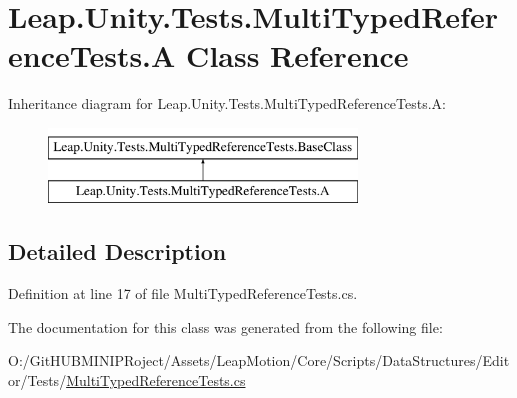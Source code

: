 \hypertarget{class_leap_1_1_unity_1_1_tests_1_1_multi_typed_reference_tests_1_1_a}{}\section{Leap.\+Unity.\+Tests.\+Multi\+Typed\+Reference\+Tests.\+A Class Reference}
\label{class_leap_1_1_unity_1_1_tests_1_1_multi_typed_reference_tests_1_1_a}
Inheritance diagram for Leap.\+Unity.\+Tests.\+Multi\+Typed\+Reference\+Tests.\+A\+:\begin{figure}[H]
\begin{center}
\leavevmode
\includegraphics[height=2.000000cm]{class_leap_1_1_unity_1_1_tests_1_1_multi_typed_reference_tests_1_1_a}
\end{center}
\end{figure}


\subsection{Detailed Description}


Definition at line 17 of file Multi\+Typed\+Reference\+Tests.\+cs.



The documentation for this class was generated from the following file\+:\begin{DoxyCompactItemize}
\item 
O\+:/\+Git\+H\+U\+B\+M\+I\+N\+I\+P\+Roject/\+Assets/\+Leap\+Motion/\+Core/\+Scripts/\+Data\+Structures/\+Editor/\+Tests/\mbox{\hyperlink{_multi_typed_reference_tests_8cs}{Multi\+Typed\+Reference\+Tests.\+cs}}\end{DoxyCompactItemize}
